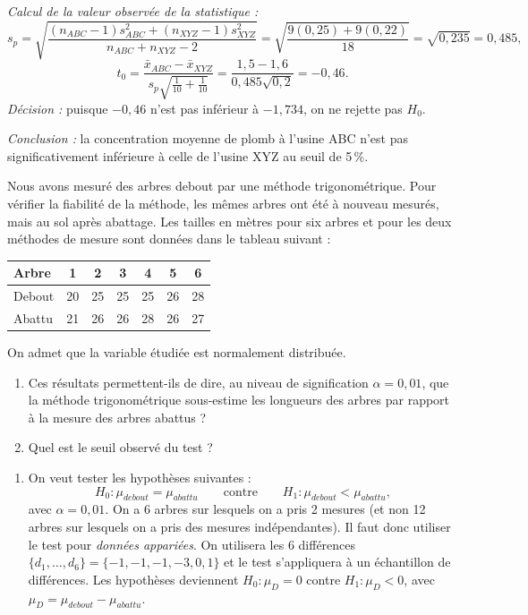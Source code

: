 \begin{exercice}
\begin{solution}
\begin{enumerate}[label=(\alph*)]
  \emph{Calcul de la valeur observée de la statistique :}
  \[
    s_p=\sqrt{\frac{(n_{ABC}-1)s^2_{ABC}+(n_{XYZ}-1)s^2_{XYZ}}{n_{ABC}+n_{XYZ}-2}}
    =\sqrt{\frac{9(0,25)+9(0,22)}{18}}=\sqrt{0,235}=0,485,
  \]
  \[
    t_0=\frac{\bar x_{ABC}-\bar x_{XYZ}}{s_p\sqrt{\frac{1}{10}+\frac{1}{10}}}
    =\frac{1,5-1,6}{0,485\sqrt{0,2}}=-0,46.
  \]
  \emph{Décision :} puisque $-0,46$ n'est pas inférieur à $-1,734$, on ne rejette pas $H_0$.

  \emph{Conclusion :} la concentration moyenne de plomb à l'usine ABC n'est pas
  significativement inférieure à celle de l'usine XYZ au seuil de 5\,\%.
\end{enumerate}
\end{solution}
\end{exercice}

\begin{exercice}
Nous avons mesuré des arbres debout par une méthode trigonométrique. Pour vérifier la
fiabilité de la méthode, les mêmes arbres ont été à nouveau mesurés, mais au sol après
abattage. Les tailles en mètres pour six arbres et pour les deux méthodes de mesure sont
données dans le tableau suivant :
\begin{center}
\begin{tabular}{lcccccc}
  \toprule
  Arbre & 1 & 2 & 3 & 4 & 5 & 6\\
  \midrule
  Debout & 20 & 25 & 25 & 25 & 26 & 28\\
  Abattu & 21 & 26 & 26 & 28 & 26 & 27\\
  \bottomrule
\end{tabular}
\end{center}
On admet que la variable étudiée est normalement distribuée.
\begin{enumerate}[label=(\alph*)]
  \item Ces résultats permettent-ils de dire, au niveau de signification $\alpha=0,01$, que
  la méthode trigonométrique sous-estime les longueurs des arbres par rapport à la mesure
  des arbres abattus ?
  \item Quel est le seuil observé du test ?
\end{enumerate}
\begin{solution}
\begin{enumerate}[label=(\alph*)]
  \item On veut tester les hypothèses suivantes :
  \[
    H_0:\mu_{debout}=\mu_{abattu}\qquad\text{contre}\qquad
    H_1:\mu_{debout}<\mu_{abattu},
  \]
  avec $\alpha=0,01$. On a 6 arbres sur lesquels on a pris 2 mesures (et non 12 arbres sur
  lesquels on a pris des mesures indépendantes). Il faut donc utiliser le test pour
  \emph{données appariées}. On utilisera les 6 différences
  $\{d_1,\dots,d_6\}=\{-1,-1,-1,-3,0,1\}$ et le test s'appliquera à un échantillon de
  différences. Les hypothèses deviennent $H_0:\mu_D=0$ contre $H_1:\mu_D<0$, avec
  $\mu_D=\mu_{debout}-\mu_{abattu}$.


\end{enumerate}
\end{solution}
\end{exercice}
